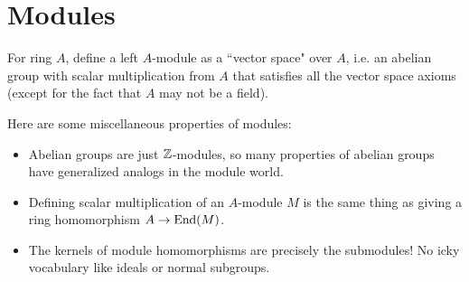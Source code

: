 \section{Modules}
For ring $A$, define a left $A$-module as a ``vector space" over $A$, i.e. an abelian group with scalar multiplication from $A$ that satisfies all the vector space axioms (except for the fact that $A$ may not be a field).

Here are some miscellaneous properties of modules:
\begin{itemize}
    \item Abelian groups are just ${\mathbb Z}$-modules, so many properties of abelian groups have generalized analogs in the module world.
    \item Defining scalar multiplication of an $A$-module $M$ is the same thing as giving a ring homomorphism $A \rightarrow \operatorname{End}(M)$.
    \item The kernels of module homomorphisms are precisely the submodules! No icky vocabulary like ideals or normal subgroups.
\end{itemize}
